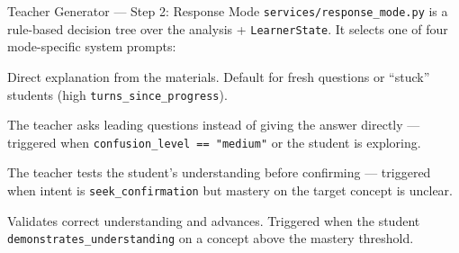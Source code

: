 \documentclass[aspectratio=169, 10pt]{beamer}
\begin{document}
\begin{frame}{Teacher Generator --- Step 2: Response Mode}
  \scriptsize
  \texttt{services/response\_mode.py} is a rule-based decision tree
  over the analysis + \texttt{LearnerState}. It selects one of four
  mode-specific system prompts:

  \begin{tcolorbox}[colback=eduLightBlue, colframe=eduBlue, title=\texttt{explain}]
    Direct explanation from the materials. Default for fresh
    questions or ``stuck'' students (high \texttt{turns\_since\_progress}).
  \end{tcolorbox}
  \begin{tcolorbox}[colback=eduLightGreen, colframe=eduGreen, title=\texttt{guide} (Socratic)]
    The teacher asks leading questions instead of giving the answer
    directly --- triggered when \texttt{confusion\_level == "medium"} or
    the student is exploring.
  \end{tcolorbox}
  \begin{tcolorbox}[colback=eduLightOrange, colframe=eduOrange, title=\texttt{quiz\_back}]
    The teacher tests the student's understanding before confirming
    --- triggered when intent is \texttt{seek\_confirmation} but mastery
    on the target concept is unclear.
  \end{tcolorbox}
  \begin{tcolorbox}[colback=eduPurple!10, colframe=eduPurple, title=\texttt{affirm}]
    Validates correct understanding and advances. Triggered when the
    student \texttt{demonstrates\_understanding} on a concept above the
    mastery threshold.
  \end{tcolorbox}
\end{frame}
\end{document}
